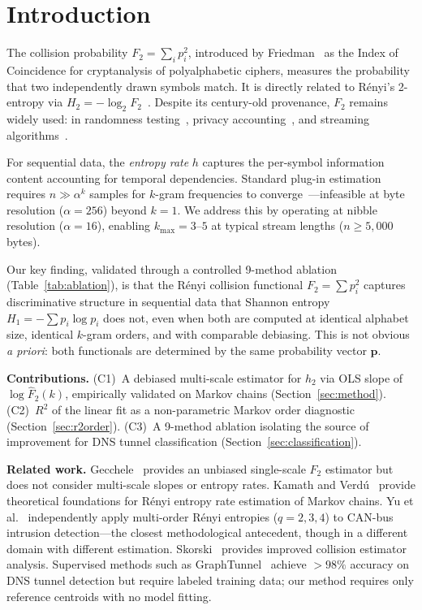 \documentclass[conference]{IEEEtran}
\begin{document}
\section{Introduction}
\label{sec:intro}

The collision probability $F_2 = \sum_i p_i^2$, introduced by Friedman~\cite{friedman1922} as the Index of Coincidence for cryptanalysis of polyalphabetic ciphers, measures the probability that two independently drawn symbols match. It is directly related to R\'enyi's 2-entropy via $H_2 = -\log_2 F_2$~\cite{renyi1961}. Despite its century-old provenance, $F_2$ remains widely used: in randomness testing~\cite{nist80090b}, privacy accounting~\cite{mironov2017rdp}, and streaming algorithms~\cite{alon1996}.

For sequential data, the \emph{entropy rate} $h$ captures the per-symbol information content accounting for temporal dependencies. Standard plug-in estimation requires $n \gg \alpha^k$ samples for $k$-gram frequencies to converge~\cite{paninski2003}---infeasible at byte resolution ($\alpha=256$) beyond $k=1$. We address this by operating at nibble resolution ($\alpha=16$), enabling $k_{\max}=3\text{--}5$ at typical stream lengths ($n \geq 5{,}000$ bytes).

Our key finding, validated through a controlled 9-method ablation (Table~\ref{tab:ablation}), is that the R\'enyi collision functional $F_2 = \sum p_i^2$ captures discriminative structure in sequential data that Shannon entropy $H_1 = -\sum p_i \log p_i$ does not, even when both are computed at identical alphabet size, identical $k$-gram orders, and with comparable debiasing. This is not obvious \emph{a priori}: both functionals are determined by the same probability vector $\mathbf{p}$.

\textbf{Contributions.}
(C1)~A debiased multi-scale estimator for $h_2$ via OLS slope of $\log \hat{F}_2(k)$, empirically validated on Markov chains (Section~\ref{sec:method}).
(C2)~$R^2$ of the linear fit as a non-parametric Markov order diagnostic (Section~\ref{sec:r2order}).
(C3)~A 9-method ablation isolating the source of improvement for DNS tunnel classification (Section~\ref{sec:classification}).

\textbf{Related work.}
Gecchele~\cite{gecchele2023} provides an unbiased single-scale $F_2$ estimator but does not consider multi-scale slopes or entropy rates. Kamath and Verd\'u~\cite{kamath2016} provide theoretical foundations for R\'enyi entropy rate estimation of Markov chains. Yu et al.~\cite{yu2020} independently apply multi-order R\'enyi entropies ($q=2,3,4$) to CAN-bus intrusion detection---the closest methodological antecedent, though in a different domain with different estimation. Skorski~\cite{skorski2023} provides improved collision estimator analysis. Supervised methods such as GraphTunnel~\cite{gao2024graphtunnel} achieve ${>}98\%$ accuracy on DNS tunnel detection but require labeled training data; our method requires only reference centroids with no model fitting.
\end{document}
